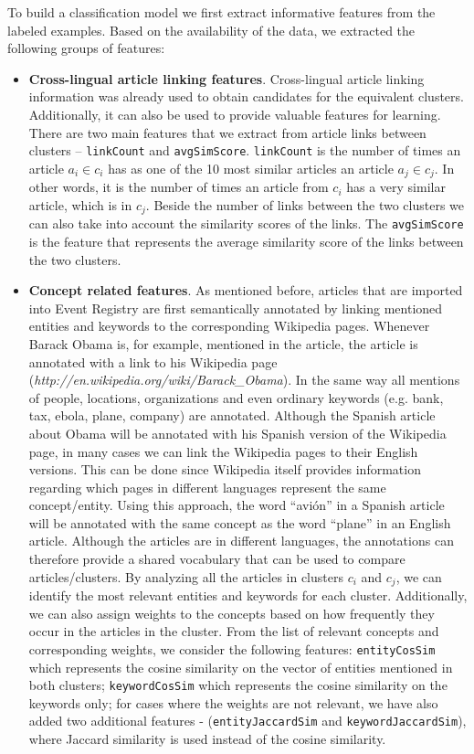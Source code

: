 \documentclass[twoside,11pt]{article}
\begin{document}
To build a classification model we first extract  informative features from the labeled examples. Based on the availability of the data, we extracted the following groups of features:

\begin{itemize}
\item {\bf Cross-lingual article linking features}. Cross-lingual article linking information was already used to obtain candidates for the equivalent clusters. Additionally, it can also be used to provide valuable  features for learning. There are two main features that we extract from article links between clusters -- \texttt{linkCount} and \texttt{avgSimScore}. \texttt{linkCount} is the number of times an article $a_i \in c_i$ has as one of the 10 most similar articles an article $a_j \in c_j$. In other words, it is the number of times an article from $c_i$ has a very similar article, which is in $c_j$. Beside the number of links between the two clusters we can also take into account the similarity scores of the links. The \texttt{avgSimScore} is the feature that represents the average similarity score of the links between the two clusters.

\item {\bf Concept related features}. As mentioned before, articles that are imported into Event Registry are first semantically annotated by linking mentioned entities and keywords to the corresponding Wikipedia pages. Whenever Barack Obama is, for example, mentioned in the article, the article is annotated with a link to his Wikipedia page (\emph{http://en.wikipedia.org/wiki/Barack\_Obama}). In the same way all mentions of people, locations, organizations and even ordinary keywords (e.g. bank, tax, ebola, plane, company) are annotated. Although the Spanish article about Obama will be annotated with his Spanish version of the Wikipedia page, in many cases we can link the Wikipedia pages to their English versions. This can be done since Wikipedia itself provides information regarding which pages in different languages represent the same concept/entity. Using this approach, the word ``avi\'on'' in a Spanish article will be annotated with the same concept as the word ``plane'' in an English article. Although the articles are in different languages, the annotations can therefore provide a shared vocabulary that can be used to compare articles/clusters. By analyzing all the articles in clusters $c_i$ and $c_j$, we can identify the most relevant entities and keywords for each cluster. Additionally, we can also assign weights to the concepts based on how frequently they occur in the articles in the cluster. From the list of relevant concepts and corresponding weights, we consider the following features: \texttt{entityCosSim} which represents the cosine similarity on the vector of entities mentioned in both clusters; \texttt{keywordCosSim} which represents the cosine similarity on the keywords only; for cases where the weights are not relevant, we have also added two additional features - (\texttt{entityJaccardSim} and \texttt{keywordJaccardSim}), where Jaccard similarity is used instead of the cosine similarity.


\end{itemize}
\end{document}
